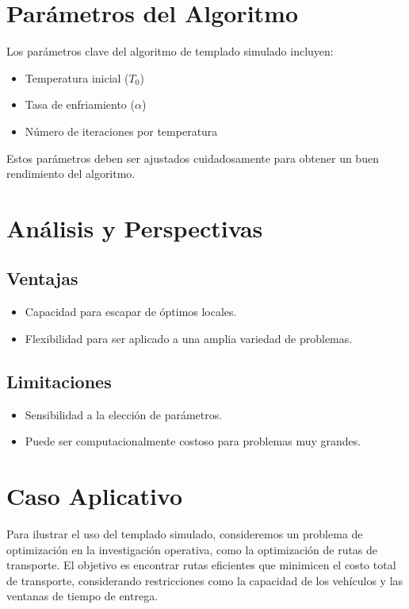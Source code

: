 \documentclass{article}
\begin{document}
\section{Parámetros del Algoritmo}
Los parámetros clave del algoritmo de templado simulado incluyen:
\begin{itemize}
    \item Temperatura inicial (\( T_0 \))
    \item Tasa de enfriamiento (\( \alpha \))
    \item Número de iteraciones por temperatura
\end{itemize}

Estos parámetros deben ser ajustados cuidadosamente para obtener un buen rendimiento del algoritmo.

\section{Análisis y Perspectivas}
\subsection{Ventajas}
\begin{itemize}
    \item Capacidad para escapar de óptimos locales.
    \item Flexibilidad para ser aplicado a una amplia variedad de problemas.
\end{itemize}

\subsection{Limitaciones}
\begin{itemize}
    \item Sensibilidad a la elección de parámetros.
    \item Puede ser computacionalmente costoso para problemas muy grandes.
\end{itemize}

\section{Caso Aplicativo}
Para ilustrar el uso del templado simulado, consideremos un problema de optimización en la investigación operativa, como la optimización de rutas de transporte. El objetivo es encontrar rutas eficientes que minimicen el costo total de transporte, considerando restricciones como la capacidad de los vehículos y las ventanas de tiempo de entrega.
\end{document}
